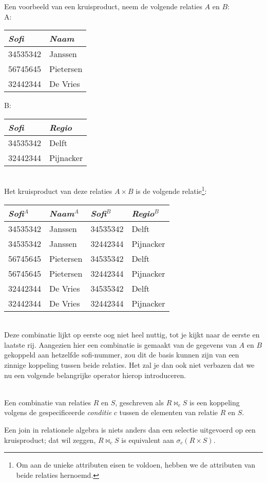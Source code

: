 Een voorbeeld van een kruisproduct, neem de volgende relaties $A$ en $B$:\\[2.5pt]
A: \begin{tabular}{|l|l|}
\hline
\textit{Sofi} & \textit{Naam}\\
\hline
34535342 & Janssen\\
56745645 & Pietersen\\
32442344 & De Vries\\
\hline
\end{tabular}
\hspace{1cm}B: \begin{tabular}{|l|l|}
\hline
\textit{Sofi} & \textit{Regio}\\
\hline
34535342 & Delft\\
32442344 & Pijnacker\\
\hline
\end{tabular}\\[2.5pt]
Het kruisproduct van deze relaties $A\times B$ is de volgende relatie\footnote{Om aan de unieke attributen eisen te voldoen, hebben we de attributen van beide relaties hernoemd.}:\\[2.5pt]
\begin{tabular}{|l|l|l|l|}
\hline
\textit{Sofi}$^A$ & \textit{Naam}$^A$ & \textit{Sofi}$^B$ & \textit{Regio}$^B$\\
\hline
34535342 & Janssen & 34535342 & Delft\\
34535342 & Janssen & 32442344 & Pijnacker\\
56745645 & Pietersen & 34535342 & Delft\\
56745645 & Pietersen & 32442344 & Pijnacker\\
32442344 & De Vries & 34535342 & Delft\\
32442344 & De Vries & 32442344 & Pijnacker\\
\hline
\end{tabular}\\[2.5pt]
Deze combinatie lijkt op eerste oog niet heel nuttig, tot je kijkt naar de eerste en laatste rij. Aangezien hier een combinatie is gemaakt van de gegevens van $A$ en $B$ gekoppeld aan hetzelfde sofi-nummer, zou dit de basis kunnen zijn van een zinnige koppeling tussen beide relaties. Het zal je dan ook niet verbazen dat we nu een volgende belangrijke operator hierop introduceren.
\begin{definition}[Join]\mbox{}\\
Een combinatie van relaties $R$ en $S$, geschreven als $R\Join_{c}S$ is een koppeling volgens de gespecificeerde \textit{conditie} $c$ tussen de elementen van relatie $R$ en $S$.
\end{definition}
Een join in relationele algebra is niets anders dan een selectie uitgevoerd op een kruisproduct; dat wil zeggen, $R\Join_c S$ is equivalent aan $\sigma_c(R\times S)$.

